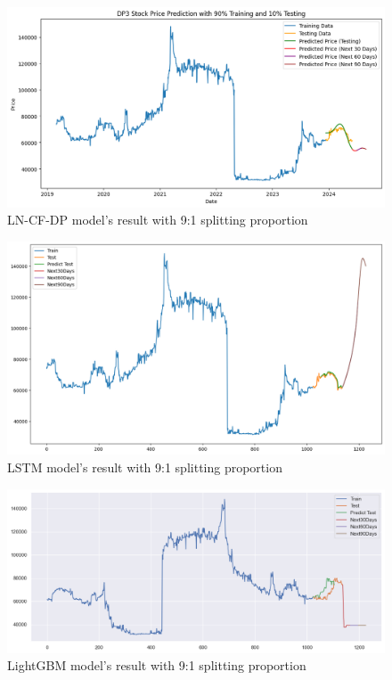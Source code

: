 \documentclass{ieeeojies}
\begin{document}
\begin{figure}[H]
  \centering
  \begin{minipage}{0.8\linewidth}
    \centering
    \includegraphics[width=\linewidth]{bibliography/Figure/DP3_LN_CF&DP.png}
    \caption{LN-CF-DP model's result with 9:1 splitting proportion}
    \label{fig8}
  \end{minipage}
\end{figure}

\begin{figure}[H]
  \centering
  \begin{minipage}{0.8\linewidth}
    \centering
    \includegraphics[width=\linewidth]{bibliography/Figure/LSTM_DP3(9_1).png}
    \caption{LSTM model's result with 9:1 splitting proportion}
    \label{fig8}
  \end{minipage}
\end{figure}

\begin{figure}[H]
  \centering
  \begin{minipage}{0.8\linewidth}
    \centering
    \includegraphics[width=\linewidth]{bibliography/Figure/LightGBM_DP3(9_1).png}
    \caption{LightGBM model's result with 9:1 splitting proportion}
    \label{fig8}
  \end{minipage}
\end{figure}
\end{document}
